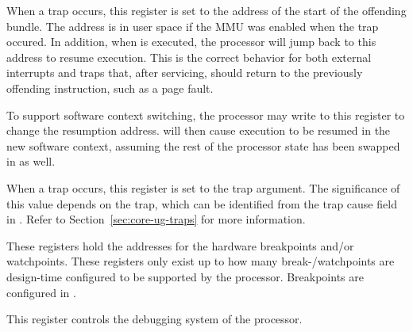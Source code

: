 \debugCanWrite{}
\coreCanWrite{}


When a trap occurs, this register is set to the address of the start of the
offending bundle. The address is in user space if the MMU was enabled when the
trap occured. In addition, when  is executed, the processor will jump
back to this address to resume execution. This is the correct behavior for both
external interrupts and traps that, after servicing, should return to the
previously offending instruction, such as a page fault.

To support software context switching, the processor may write to this register
to change the resumption address.  will then cause execution to be
resumed in the new software context, assuming the rest of the processor state
has been swapped in as well.

\debugCanWrite{}
\coreCanWrite{}


When a trap occurs, this register is set to the trap argument. The significance
of this value depends on the trap, which can be identified from the trap cause
field in . Refer to Section~\ref{sec:core-ug-traps} for more
information.

\debugCanWrite{}


These registers hold the addresses for the hardware breakpoints and/or
watchpoints. These registers only exist up to how many break-/watchpoints are
design-time configured to be supported by the processor. Breakpoints are
configured in .

\debugCanWrite{}
\coreCanWrite{}


This register controls the debugging system of the \rvex{} processor.

\debugCanWrite{}

